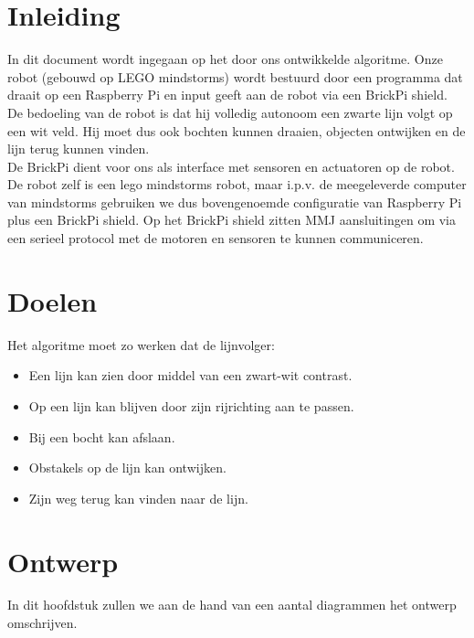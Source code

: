 \documentclass[12pt]{article}
\begin{document}
\newpage

\section{Inleiding}
	In dit document wordt ingegaan op het door ons ontwikkelde algoritme. Onze robot (gebouwd op LEGO mindstorms) wordt bestuurd door een programma dat draait op een Raspberry Pi en input geeft aan de robot via een BrickPi shield.\\
	De bedoeling van de robot is dat hij volledig autonoom een zwarte lijn volgt op een wit veld. Hij moet dus ook bochten kunnen draaien, objecten ontwijken en de lijn terug kunnen vinden.\\
	De BrickPi dient voor ons als interface met sensoren en actuatoren op de robot. De robot zelf is een lego mindstorms robot, maar i.p.v. de meegeleverde computer van mindstorms gebruiken we dus bovengenoemde configuratie van Raspberry Pi plus een BrickPi shield. Op het BrickPi shield zitten MMJ aansluitingen om via een serieel protocol met de motoren en sensoren te kunnen communiceren.
\newpage

\section{Doelen}
	Het algoritme moet zo werken dat de lijnvolger:
	\begin{itemize}
		\item Een lijn kan zien door middel van een zwart-wit contrast.
		\item Op een lijn kan blijven door zijn rijrichting aan te passen.
		\item Bij een bocht kan afslaan.
		\item Obstakels op de lijn kan ontwijken.
		\item Zijn weg terug kan vinden naar de lijn.
	\end{itemize}
\newpage
\section{Ontwerp}
	In dit hoofdstuk zullen we aan de hand van een aantal diagrammen het ontwerp omschrijven.
\end{document}
